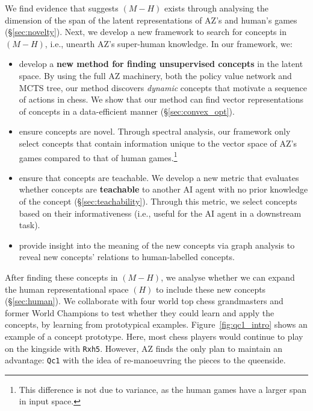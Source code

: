 \documentclass{article}
\newcommand{\ct}[1]{\texttt{#1}}
\begin{document}
We find evidence that suggests $(M-H)$ exists through analysing the dimension of the span of the latent representations of AZ's and human's games (\S\ref{sec:novelty}). 
Next, we develop a new framework to search for concepts in $(M-H)$, i.e., unearth AZ's super-human knowledge.
In our framework, we: 
\begin{itemize}
    \item develop a \textbf{new method for finding unsupervised concepts} in the latent space.
    By using the full AZ machinery, both the policy value network and MCTS tree,
    our method discovers \textit{dynamic} concepts 
    that motivate a sequence of actions in chess. We show that our method can find vector representations of concepts in a data-efficient manner (\S\ref{sec:convex_opt}).
    \item  ensure concepts are novel.
    Through spectral analysis, our framework only select concepts that contain information unique to the vector space of AZ's games compared to that of human games.\footnote{This difference is not due to variance, as the human games have a larger span in input space.}
    \item ensure that concepts are teachable. We develop a new metric that evaluates whether concepts are \textbf{teachable} to another AI agent with no prior knowledge of the concept (\S\ref{sec:teachability}). Through this metric, we select concepts based on their informativeness (i.e., useful for the AI agent in a downstream task).  
    \item provide insight into the meaning of the new concepts via graph analysis to reveal new concepts' relations to human-labelled concepts.
\end{itemize}
After finding these concepts in $(M-H)$, we analyse whether we can expand the human representational space $(H)$ to include these new concepts (\S\ref{sec:human}). We collaborate with four world top chess grandmasters and former World Champions to test whether they could learn and apply the concepts, by learning from prototypical examples. Figure~\ref{fig:qc1_intro} shows an example of a concept prototype. Here, most chess players would continue to play on the kingside with \ct{Rxh5}. However, AZ finds the only plan to maintain an advantage: \ct{Qc1} with the idea of re-manoeuvring the pieces to the queenside. 
\end{document}
